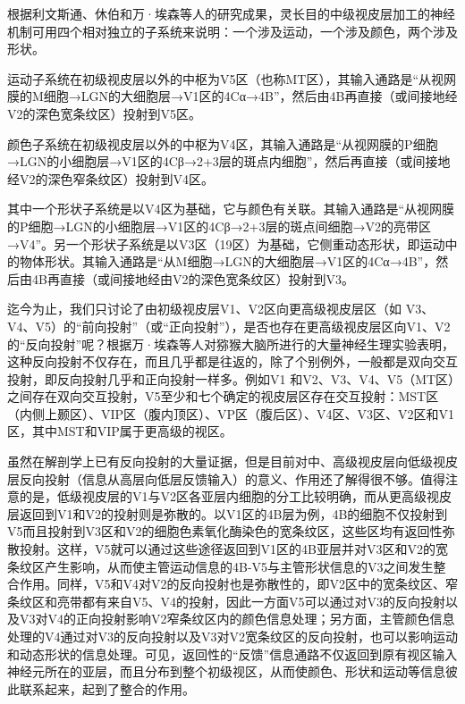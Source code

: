 \documentclass[a4paper,12pt]{article}
\begin{document}
根据利文斯通、休伯和万·埃森等人\cite{14:misc}的研究成果，灵长目的中级视皮层加工的神经机制可用四个相对独立的子系统来说明：一个涉及运动，一个涉及颜色，两个涉及形状。
        


运动子系统在初级视皮层以外的中枢为V5区（也称MT区），其输入通路是“从视网膜的M细胞→LGN的大细胞层→V1区的4Cα→4B”，然后由4B再直接（或间接地经V2的深色宽条纹区）投射到V5区。
        


颜色子系统在初级视皮层以外的中枢为V4区，其输入通路是“从视网膜的P细胞→LGN的小细胞层→V1区的4Cβ→2+3层的斑点内细胞”，然后再直接（或间接地经V2的深色窄条纹区）投射到V4区。
        


其中一个形状子系统是以V4区为基础，它与颜色有关联。其输入通路是“从视网膜的P细胞→LGN的小细胞层→V1区的4Cβ→2+3层的斑点间细胞→V2的亮带区→V4”。另一个形状子系统是以V3区（19区）为基础，它侧重动态形状，即运动中的物体形状。其输入通路是“从M细胞→LGN的大细胞层→V1区的4Cα→4B”，然后由4B再直接（或间接地经由V2的深色宽条纹区）投射到V3。
        


迄今为止，我们只讨论了由初级视皮层V1、V2区向更高级视皮层区（如 V3、V4、V5）的“前向投射”（或“正向投射”），是否也存在更高级视皮层区向V1、V2的“反向投射”呢？根据万·埃森等人对猕猴大脑所进行的大量神经生理实验表明，这种反向投射不仅存在，而且几乎都是往返的，除了个别例外，一般都是双向交互投射，即反向投射几乎和正向投射一样多。例如V1 和V2、V3、V4、V5（MT区）之间存在双向交互投射，V5至少和七个确定的视皮层区存在交互投射：MST区（内侧上颞区）、VIP区（腹内顶区）、VP区（腹后区）、V4区、V3区、V2区和V1区，其中MST和VIP属于更高级的视区。
         


虽然在解剖学上已有反向投射的大量证据，但是目前对中、高级视皮层向低级视皮层反向投射（信息从高层向低层反馈输入）的意义、作用还了解得很不够\cite{14:misc}。值得注意的是，低级视皮层的V1与V2区各亚层内细胞的分工比较明确，而从更高级视皮层返回到V1和V2的投射则是弥散的。以V1区的4B层为例，4B的细胞不仅投射到V5而且投射到V3区和V2的细胞色素氧化酶染色的宽条纹区，这些区均有返回性弥散投射。这样，V5就可以通过这些途径返回到V1区的4B亚层并对V3区和V2的宽条纹区产生影响，从而使主管运动信息的4B-V5与主管形状信息的V3之间发生整合作用。同样，V5和V4对V2的反向投射也是弥散性的，即V2区中的宽条纹区、窄条纹区和亮带都有来自V5、V4的投射，因此一方面V5可以通过对V3的反向投射以及V3对V4的正向投射影响V2窄条纹区内的颜色信息处理；另方面，主管颜色信息处理的V4通过对V3的反向投射以及V3对V2宽条纹区的反向投射，也可以影响运动和动态形状的信息处理。可见，返回性的“反馈”信息通路不仅返回到原有视区输入神经元所在的亚层，而且分布到整个初级视区，从而使颜色、形状和运动等信息彼此联系起来，起到了整合的作用。
\end{document}
